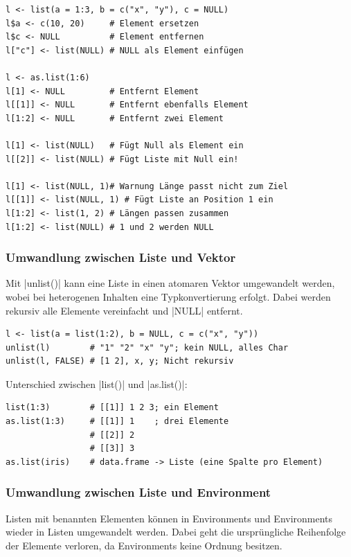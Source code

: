 \documentclass[10pt,twocolumn]{scrartcl}
\renewcommand{\lstinline}{\mycoloredinline}
\begin{document}
\begin{lstlisting}
l <- list(a = 1:3, b = c("x", "y"), c = NULL)
l$a <- c(10, 20)     # Element ersetzen
l$c <- NULL          # Element entfernen
l["c"] <- list(NULL) # NULL als Element einfügen

l <- as.list(1:6)
l[1] <- NULL         # Entfernt Element
l[[1]] <- NULL       # Entfernt ebenfalls Element
l[1:2] <- NULL       # Entfernt zwei Element

l[1] <- list(NULL)   # Fügt Null als Element ein
l[[2]] <- list(NULL) # Fügt Liste mit Null ein!

l[1] <- list(NULL, 1)# Warnung Länge passt nicht zum Ziel
l[[1]] <- list(NULL, 1) # Fügt Liste an Position 1 ein
l[1:2] <- list(1, 2) # Längen passen zusammen
l[1:2] <- list(NULL) # 1 und 2 werden NULL
\end{lstlisting}


\subsubsection{Umwandlung zwischen Liste und Vektor}

Mit \lstinline|unlist()| kann eine Liste in einen atomaren Vektor umgewandelt werden, wobei bei heterogenen Inhalten eine Typkonvertierung erfolgt. Dabei werden rekursiv alle Elemente vereinfacht und \lstinline|NULL| entfernt.

\begin{lstlisting}
l <- list(a = list(1:2), b = NULL, c = c("x", "y"))
unlist(l)        # "1" "2" "x" "y"; kein NULL, alles Char
unlist(l, FALSE) # [1 2], x, y; Nicht rekursiv
\end{lstlisting}

Unterschied zwischen \lstinline|list()| und \lstinline|as.list()|:

\begin{lstlisting}
list(1:3)        # [[1]] 1 2 3; ein Element
as.list(1:3)     # [[1]] 1    ; drei Elemente
                 # [[2]] 2
                 # [[3]] 3
as.list(iris)    # data.frame -> Liste (eine Spalte pro Element)
\end{lstlisting}


\subsubsection{Umwandlung zwischen Liste und Environment}

Listen mit benannten Elementen können in Environments und Environments wieder in Listen umgewandelt werden. Dabei geht die ursprüngliche Reihenfolge der Elemente verloren, da Environments keine Ordnung besitzen.
\end{document}
